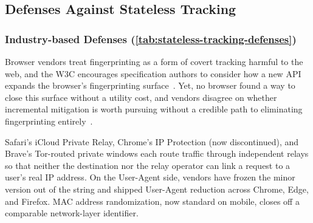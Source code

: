 \subsection{Defenses Against Stateless Tracking}
\label{sec:stateless-defenses}


\subsubsection{Industry-based Defenses (\autoref{tab:stateless-tracking-defenses})}
\label{sec:stateless-defenses-industry}



Browser vendors treat fingerprinting as a form of covert tracking harmful to the web, and the W3C encourages specification authors to consider how a new API expands the browser's fingerprinting surface~\cite{nottinghamUnsanctionedWebTracking2015,dotyMitigatingBrowserFingerprinting2019}.
%
Yet, no browser found a way to close this surface without a utility cost, and vendors disagree on whether incremental mitigation is worth pursuing without a credible path to eliminating fingerprinting entirely~\cite{snyderBraveFingerprintingPrivacy2019,rescorlaTechnicalCommentsPrivacy2021}.


%
Safari's iCloud Private Relay, Chrome's IP Protection (now discontinued), and Brave's Tor-routed private windows each route traffic through independent relays so that neither the destination nor the relay operator can link a request to a user's real IP address.
%
On the User-Agent side, vendors have frozen the minor version out of the string and shipped User-Agent reduction across Chrome, Edge, and Firefox.
%
MAC address randomization, now standard on mobile, closes off a comparable network-layer identifier.


